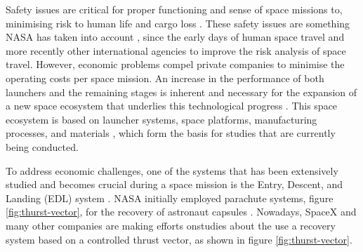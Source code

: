 Safety issues are critical for proper functioning and sense of space missions to, minimising risk to human life  and cargo loss \cite{quinn_acceptable_nodate}. These safety issues are something NASA has taken into account \cite{shin_nasa_2014}, since the early days of human space travel and more recently other international agencies to improve the risk analysis of space travel.  However, economic problems compel private companies to minimise the operating costs per space mission. An increase in the performance of both launchers and the remaining stages is inherent and necessary for the expansion of a new space ecosystem that underlies this technological progress \cite{garzaniti_review_2021}. This space ecosystem is  based on launcher systems, space platforms, manufacturing processes, and materials \cite{garzaniti_review_2021}, which form the basis for studies that are currently being conducted.

To address economic challenges, one of the systems that has been extensively studied and becomes crucial during a space mission is the Entry, Descent, and Landing (EDL) system \cite{diaz-silva_rotary_2013}. NASA initially employed parachute systems, figure \ref{fig:thurst-vector}, for the recovery of astronaut capsules \cite{ragab_launch_2015}. Nowadays,  SpaceX \cite{noauthor_spacex_nodate} and many other companies are making efforts onstudies about the use a recovery system based on a controlled thrust vector, as shown in figure \ref{fig:thurst-vector}.

